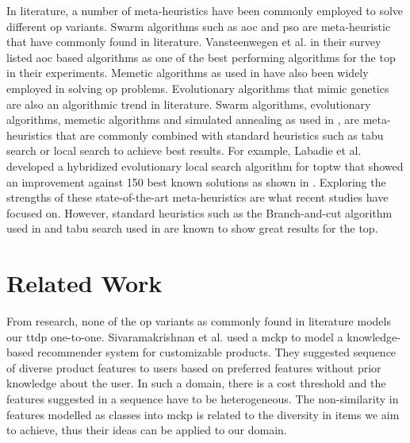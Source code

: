 In literature, a number of meta-heuristics have been commonly employed to solve different \gls{op} variants. Swarm algorithms such as \Gls{aoc} \parencite{Ke2008AntsProblem, Wagner2016StealingProblem, Mukhina2019OrienteeringConstruction} and \gls{pso} \parencite{Sevkli2010StPSO:Optimization, Wagner2016StealingProblem} are meta-heuristic that have commonly found in literature. Vansteenwegen et al.\parencite{Vansteenwegen2011TheSurvey}  in their survey listed \gls{aoc} based algorithms as one of the best performing algorithms for the \gls{top} in their experiments. Memetic algorithms as used in \parencite{Lu2018AConstraints,Bouly2010AProblem, Divsalar2014ASelection} have also been widely employed in solving \gls{op} problems. Evolutionary algorithms that mimic genetics are also an algorithmic trend in literature\parencite{Wu2018EvolutionaryProblem, Faeda2020AProblem, Kobeaga2018AnProblem}. Swarm algorithms, evolutionary algorithms, memetic algorithms and simulated annealing as used in \parencite{Pan2018IndependentTourist}, are meta-heuristics that are commonly combined with standard heuristics such as tabu search\parencite{Lu2018AConstraints} or local search\parencite{Divsalar2014ASelection,Bouly2010AProblem} to achieve best results. For example, Labadie et al. developed a hybridized evolutionary local search algorithm for \gls{toptw} that showed an improvement against 150 best known solutions as shown in \parencite{OP_Solution_Gunawan}. Exploring the strengths of these state-of-the-art meta-heuristics are what recent studies have focused on.  However, standard heuristics such as the Branch-and-cut algorithm used in \parencite{Dang2013AProblem} and tabu search used in \parencite{E.2005AProblem} are known to show great results for the \gls{top}. 

\section{Related Work}
From research, none of the \gls{op} variants as commonly found in literature models our \gls{ttdp} one-to-one. Sivaramakrishnan et al.\parencite{MCKP_CustomProducts} used a \gls{mckp} to model a knowledge-based recommender system for customizable products. They suggested sequence of diverse product features to users based on preferred features without prior knowledge about the user. In such a domain, there is a cost threshold and the features suggested in a sequence have to be heterogeneous. The non-similarity in features modelled as classes into \gls{mckp} is related to the diversity in items we aim to achieve, thus their ideas can be applied to our domain. 

